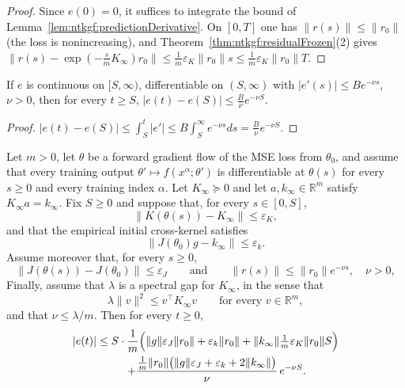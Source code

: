 \begin{proof}
  \leanok
Since $e(0)=0$, it suffices to integrate the bound of Lemma~\ref{lem:ntkgf:predictionDerivative}. On $[0,T]$ one has $\|r(s)\|\le\|r_0\|$ (the loss is nonincreasing), and Theorem~\ref{thm:ntkgf:residualFrozen}(2) gives
$\|r(s)-\exp(-\tfrac smK_\infty)r_0\|\le\frac1m\varepsilon_K\|r_0\|s\le\frac1m\varepsilon_K\|r_0\|T$.
\end{proof}

\begin{lemma}\label{lem:ntkgf:expTail}
  \leanok
If $e$ is continuous on $[S,\infty)$, differentiable on $(S,\infty)$ with $|e'(s)|\le B e^{-\nu s}$, $\nu>0$, then for every $t\ge S$, $|e(t)-e(S)|\le\frac B\nu e^{-\nu S}$.
\end{lemma}

\begin{proof}
  \leanok
$|e(t)-e(S)|\le\int_S^t|e'|\le B\int_S^\infty e^{-\nu s}ds=\frac B\nu e^{-\nu S}$.
\end{proof}

\begin{theorem}\label{thm:ntkgf:predictionUniform}
  \leanok
Let $m>0$, let $\theta$ be a forward gradient flow of the MSE loss from $\theta_0$, and
assume that every training output $\theta'\mapsto f(x^\alpha;\theta')$ is differentiable at
$\theta(s)$ for every $s\ge0$ and every training index $\alpha$. Let $K_\infty\succeq0$ and
let $a,k_\infty\in\mathbb R^m$ satisfy $K_\infty a=k_\infty$. Fix $S\ge0$ and suppose that,
for every $s\in[0,S]$,
\[
  \|K(\theta(s))-K_\infty\|\le\varepsilon_K,
\]
and that the empirical initial cross-kernel satisfies
\[
  \|J(\theta_0)g-k_\infty\|\le\varepsilon_k.
\]
Assume moreover that, for every $s\ge0$,
\[
  \|J(\theta(s))-J(\theta_0)\|\le\varepsilon_J
  \qquad\text{and}\qquad
  \|r(s)\|\le\|r_0\|e^{-\nu s},
  \quad \nu>0,
\]
Finally, assume that $\lambda$ is a spectral gap for $K_\infty$, in the sense that
\[
  \lambda\|v\|^2\le v^\top K_\infty v\qquad\text{for every }v\in\mathbb R^m,
\]
and that $\nu\le\lambda/m$. Then for every $t\ge0$,
\begin{multline*}
  |e(t)|\le S\cdot\frac1m\Bigl(\|g\|\varepsilon_J\|r_0\|+\varepsilon_k\|r_0\|+\|k_\infty\|\tfrac1m\varepsilon_K\|r_0\|S\Bigr)\\
  \qquad+\frac{\tfrac1m\|r_0\|\bigl(\|g\|\varepsilon_J+\varepsilon_k+2\|k_\infty\|\bigr)}{\nu}\,e^{-\nu S}.
\end{multline*}
\end{theorem}

